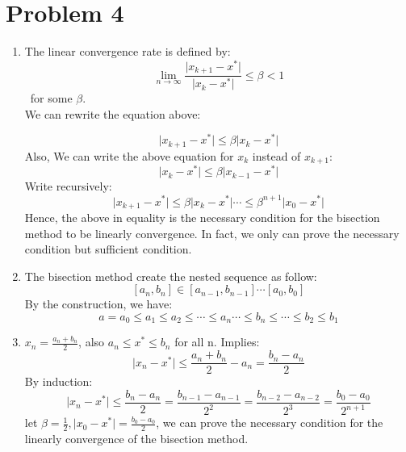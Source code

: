 \documentclass[11pt]{article}
\newcommand{\1}{\mathbbm{1}}
\begin{document}
\section*{Problem 4}
\begin{enumerate}
\item The linear convergence rate is defined by:
$$\lim_{n \to\infty} \frac{\vert x_{k+1}-x^{*} \vert}{\vert x_{k}-x^{*} \vert} \leq \beta < 1$$\, for some $\beta$.\\
We can rewrite the equation above:

$$
\vert x_{k+1}-x^{*}\vert  \leq \beta \vert x_{k}-x^{*} \vert
$$
Also, We can write the above equation for $x_k$ instead of $x_{k+1}$:
$$\vert x_{k}-x^{*} \vert \leq \beta \vert x_{k-1}-x^{*} \vert
$$
Write recursively:
$$\vert x_{k+1}-x^{*}\vert  \leq \beta \vert x_{k}-x^{*} \vert \cdots \leq \beta^{n+1} \vert x_{0}-x^{*}\vert$$
Hence, the above in equality is the necessary condition for the bisection method to be linearly convergence. In fact, we only can prove the necessary condition but sufficient condition.
\item The bisection method create the nested sequence as follow:
$$[a_n,b_n]\in [a_{n-1},b_{n-1}] \cdots [a_0,b_0]$$
By the construction, we have:
$$a=a_0\leq a_1 \leq a_2 \leq  \cdots \leq a_n \cdots  \leq  b_n \leq \cdots \leq b_2 \leq b_1$$
\item $x_n = \frac{a_n+b_n}{2}$, also $a_n \leq x^* \leq b_n$ for all n.
Implies:
$$\vert x_n -x^* \vert \leq \frac{a_n+b_n}{2} - a_n  = \frac{b_n-a_n}{2}$$
By induction: \\

$$\vert x_n -x^* \vert  \leq \frac{b_n - a_n}{2} =  \frac{b_{n-1} - a_{n-1} }{2^2} =  \frac{b_{n-2} - a_{n-2} }{2^3} =  \frac{b_0 - a_0 }{2^{n+1}}$$
let $\beta = \frac{1}{2}, $$\vert x_0 -x^* \vert  = \frac{b_0-a_0}{2}$, we can prove the necessary condition for the linearly convergence of the bisection method.
\end{enumerate}
\end{document}
